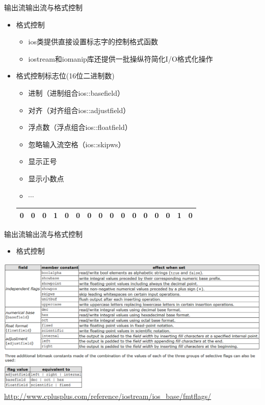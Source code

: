 \begin{frame}[t, fragile]{输出流}{输出流与格式控制}%
  \stretchon
  \begin{itemize}
  \item 格式控制
    \begin{itemize}
    \item ios类提供直接设置标志字的控制格式函数
    \item iostream和iomanip库还提供一批操纵符简化I/O格式化操作 
    \end{itemize}
  \item 格式控制标志位(16位二进制数)
    \begin{itemize}
    \item 进制（进制组合ios::basefield）
    \item 对齐（对齐组合ios::adjustfield）
    \item 浮点数（浮点组合ios::floatfield）
    \item 忽略输入流空格（ios::skipws）
    \item 显示正号
    \item 显示小数点
    \item $\cdots$
    \end{itemize}
      \scriptsize
      \begin{tabular}{|c|c|c|c|c|c|c|c|c|c|c|c|c|c|c|c|}
        \hline
        0 & 0 & 0 & 1 & 0 & 0 & 0 & 0 & 0 & 0 & 0 & 0 & 0 & 0 & 1 & 0\\
        \hline
      \end{tabular}
  \end{itemize}
  \stretchoff
\end{frame}

\begin{frame}[t, fragile]{输出流}{输出流与格式控制}%
  \stretchon
  \begin{itemize}
  \item 格式控制    
  \end{itemize}
  \includegraphics[width=1.0\textwidth]{figure/chap08/05fomatflag}\\
  {\scriptsize
    \url{http://www.cplusplus.com/reference/iostream/ios_base/fmtflags/}}
  \stretchoff
\end{frame}

